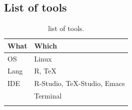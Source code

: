 \documentclass[a4paper,12pt,titlepage]{article} %
\begin{document}
\subsection{List of tools}
\begin{table}[h]
	\begin{tabularx}{\textwidth}{|l|X|}
		\hline
		What & Which \\
		\hline
		OS & Linux \\
		\hline
		Lang & R, \TeX \\
		\hline
		IDE & R-Studio, \TeX-Studio, Emacs\\
		\hline
		& Terminal\\
		\hline
		& \\
		\hline
	\end{tabularx}
	\caption{list of tools.}
\end{table}

\newpage
\listoftables

\newpage
\listoffigures

\end{document}

